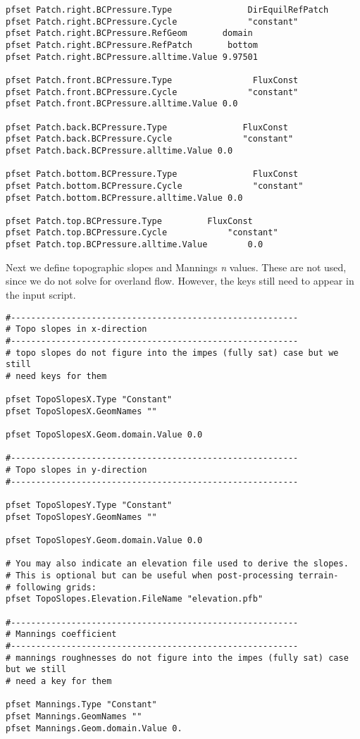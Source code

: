 \begin{verbatim}
pfset Patch.right.BCPressure.Type               DirEquilRefPatch
pfset Patch.right.BCPressure.Cycle              "constant"
pfset Patch.right.BCPressure.RefGeom       domain
pfset Patch.right.BCPressure.RefPatch       bottom
pfset Patch.right.BCPressure.alltime.Value 9.97501

pfset Patch.front.BCPressure.Type                FluxConst
pfset Patch.front.BCPressure.Cycle              "constant"
pfset Patch.front.BCPressure.alltime.Value 0.0

pfset Patch.back.BCPressure.Type               FluxConst
pfset Patch.back.BCPressure.Cycle              "constant"
pfset Patch.back.BCPressure.alltime.Value 0.0

pfset Patch.bottom.BCPressure.Type               FluxConst
pfset Patch.bottom.BCPressure.Cycle              "constant"
pfset Patch.bottom.BCPressure.alltime.Value 0.0

pfset Patch.top.BCPressure.Type			FluxConst
pfset Patch.top.BCPressure.Cycle			"constant"
pfset Patch.top.BCPressure.alltime.Value		0.0
\end{verbatim}

Next we define topographic slopes and Mannings \emph{n} values. 
These are not used, since we do not solve for overland flow.  
However, the keys still need to appear in the input script.

\begin{verbatim}
#---------------------------------------------------------
# Topo slopes in x-direction
#---------------------------------------------------------
# topo slopes do not figure into the impes (fully sat) case but we still
# need keys for them

pfset TopoSlopesX.Type "Constant"
pfset TopoSlopesX.GeomNames ""

pfset TopoSlopesX.Geom.domain.Value 0.0

#---------------------------------------------------------
# Topo slopes in y-direction
#---------------------------------------------------------

pfset TopoSlopesY.Type "Constant"
pfset TopoSlopesY.GeomNames ""

pfset TopoSlopesY.Geom.domain.Value 0.0

# You may also indicate an elevation file used to derive the slopes.
# This is optional but can be useful when post-processing terrain-
# following grids:
pfset TopoSlopes.Elevation.FileName "elevation.pfb"

#---------------------------------------------------------
# Mannings coefficient 
#---------------------------------------------------------
# mannings roughnesses do not figure into the impes (fully sat) case but we still
# need a key for them

pfset Mannings.Type "Constant"
pfset Mannings.GeomNames ""
pfset Mannings.Geom.domain.Value 0.
\end{verbatim}

